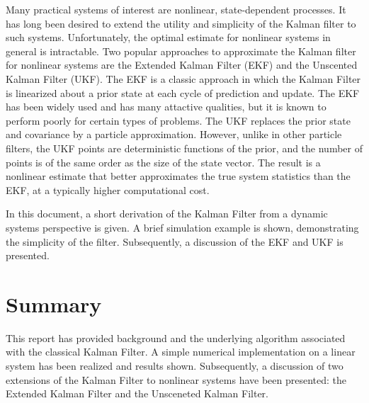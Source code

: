 \documentclass[12pt,draftcls,onecolumn]{IEEEtran}
\begin{document}
Many practical systems of interest are nonlinear, state-dependent processes.
It has long been desired to extend the utility and simplicity of the Kalman filter to such systems.
Unfortunately, the optimal estimate for nonlinear systems in general is intractable\cite{kay1993}.
Two popular approaches to approximate the Kalman filter for nonlinear systems are the Extended Kalman Filter (EKF) and the Unscented Kalman Filter (UKF).
The EKF is a classic approach in which the Kalman Filter is linearized about a prior state at each cycle of prediction and update.
The EKF has been widely used and has many attactive qualities, but it is known to perform poorly for certain types of problems\cite{wan2000}.
The UKF replaces the prior state and covariance by a particle approximation.
However, unlike in other particle filters, the UKF points are deterministic functions of the prior, and the number of points is of the same order as the size of the state vector.
The result is a nonlinear estimate that better approximates the true system statistics than the EKF, at a typically higher computational cost.

In this document, a short derivation of the Kalman Filter from a dynamic systems perspective is given.
A brief simulation example is shown, demonstrating the simplicity of the filter.
Subsequently, a discussion of the EKF and UKF is presented.







\section{Summary}

This report has provided background and the underlying algorithm associated with the classical Kalman Filter.
A simple numerical implementation on a linear system has been realized and results shown.
Subsequently, a discussion of two extensions of the Kalman Filter to nonlinear systems have been presented: the Extended Kalman Filter and the Unsceneted Kalman Filter.




\appendix

\end{document}
